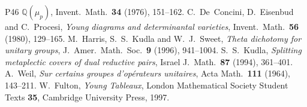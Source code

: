 \documentclass[10pt]{amsart}
\theoremstyle{definition}
\theoremstyle{remark}
\begin{document}
\begin{thebibliography}{P46}
{$\mathbb Q(\mu_p)$}, Invent.\ Math.\ \textbf{34} (1976), 151--162.
 C.~De~Concini, D.~Eisenbud and C.~Procesi, \emph{Young diagrams and determinantal
varieties}, Invent.\ Math.\ \textbf{56} (1980), 129--165.
 M.~Harris, S.~S.~Kudla and W.~J.~Sweet, \emph{Theta dichotomy for unitary groups},
J.\ Amer.\ Math.\ Soc.\ \textbf{9} (1996), 941--1004.
 S.~S.~Kudla, \emph{Splitting metaplectic covers of dual reductive pairs},
Israel J.\ Math.\ \textbf{87} (1994), 361--401.
 A.~Weil, \emph{Sur certains groupes d'op\'erateurs unitaires}, Acta Math.\
\textbf{111} (1964), 143--211.
 W.~Fulton, \emph{Young Tableaux}, London Mathematical Society Student Texts
\textbf{35}, Cambridge University Press, 1997.
\end{thebibliography}
\end{document}
